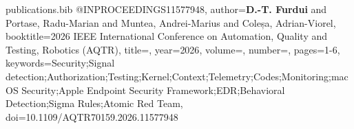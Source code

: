 
\begin{filecontents}[overwrite]{publications.bib}
@INPROCEEDINGS{11577948,
  author={\textbf{D.-T. Furdui} and Portase, Radu-Marian and Muntea, Andrei-Marius and Coleșa, Adrian-Viorel},
  booktitle={2026 IEEE International Conference on Automation, Quality and Testing, Robotics (AQTR)},
  title={{}},
  year={2026},
  volume={},
  number={},
  pages={1-6},
  keywords={Security;Signal detection;Authorization;Testing;Kernel;Context;Telemetry;Codes;Monitoring;macOS Security;Apple Endpoint Security Framework;EDR;Behavioral Detection;Sigma Rules;Atomic Red Team},
  doi={10.1109/AQTR70159.2026.11577948}}
\end{filecontents}

\nocite{*}

\begin{minipage}{\linewidth}\small\raggedright
  
\end{minipage}\par\smallskip
